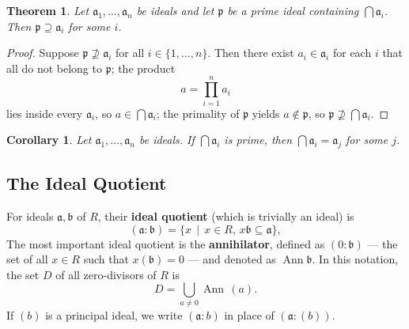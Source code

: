 \documentclass[11pt]{article}
\newtheorem{theorem}{Theorem}
\newtheorem{corollary}{Corollary}
\newcommand{\Ann}{\operatorname{Ann}}
\begin{document}
\begin{adjustwidth}{0.5cm}{}
	\begin{theorem}
		Let $\mathfrak{a}_{1}, \ldots, \mathfrak{a}_{n}$ be ideals and let $\mathfrak{p}$ be a prime ideal containing $\bigcap \mathfrak{a}_{i}$. Then $\mathfrak{p} \supseteq \mathfrak{a}_{i}$ for some $i$. 
	\end{theorem}
	\begin{proof}
		Suppose $\mathfrak{p} \nsupseteq \mathfrak{a}_{i}$ for all $i \in \{ 1, \ldots, n \}$. Then there exist $a_{i} \in \mathfrak{a}_{i}$ for each $i$ that all do not belong to $\mathfrak{p}$; the product
		\[
			a = \prod\limits_{i = 1}^{n} a_{i}
		\]
		lies inside every $\mathfrak{a}_{i}$, so $a \in \bigcap \mathfrak{a}_{i}$; the primality of $\mathfrak{p}$ yields $a \notin \mathfrak{p}$, so $\mathfrak{p} \nsupseteq \bigcap \mathfrak{a}_{i}$.
	\end{proof}
	\begin{corollary}
		Let $\mathfrak{a}_{1}, \ldots, \mathfrak{a}_{n}$ be ideals. If $\bigcap \mathfrak{a}_{i}$ is prime, then $\bigcap \mathfrak{a}_{i} = \mathfrak{a}_{j}$ for some $j$.
	\end{corollary}
\end{adjustwidth}


\subsection{The Ideal Quotient}

For ideals $\mathfrak{a}, \mathfrak{b}$ of $R$, their \textbf{ideal quotient} (which is trivially an ideal) is
\[
	(\mathfrak{a} : \mathfrak{b}) = \{ x \,\mid\, x \in R, \, x \mathfrak{b} \subseteq \mathfrak{a} \},
\]
The most important ideal quotient is the \textbf{annihilator}, defined as $(0 : \mathfrak{b})$ --- the set of all $x \in R$ such that $x (\mathfrak{b}) = 0$ --- and denoted as $\Ann \mathfrak{b}$. In this notation, the set $D$ of all zero-divisors of $R$ is
\[
	D = \bigcup\limits_{a \ne 0} \Ann \, (a).
\]
If $(b)$ is a principal ideal, we write $(\mathfrak{a} : b)$ in place of $(\mathfrak{a} : (b))$.
\end{document}
